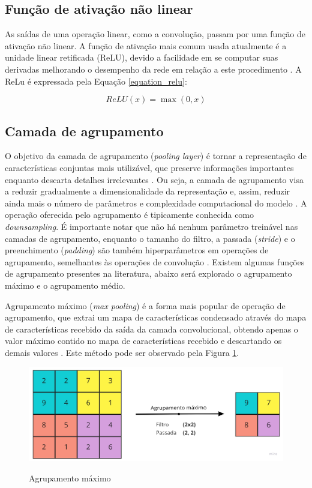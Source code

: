 \documentclass[
	12pt,				%
	oneside,			%
	a4paper,			%
	english,			%
	brazil				%
	]{abntex2ppgsi}
\begin{document}
\subsection{Função de ativação não linear}
As saídas de uma operação linear, como a convolução, passam por uma função de ativação não linear. A função de ativação mais comum usada atualmente é a unidade linear retificada (ReLU), devido a facilidade em se computar suas derivadas melhorando o desempenho da rede em relação a este procedimento \cite{albawi2017understanding}. A ReLu é expressada pela Equação \ref{equation_relu}:

\begin{equation}
  ReLU(x)=\max(0, x)
  \label{equation_relu}
\end{equation}

\subsection{Camada de agrupamento}
O objetivo da camada de agrupamento (\textit{pooling layer}) é tornar a representação de características conjuntas mais utilizável, que preserve informações importantes enquanto descarta detalhes irrelevantes \cite{yu2014mixed}. Ou seja, a camada de agrupamento visa a reduzir gradualmente a dimensionalidade da representação e, assim, reduzir ainda mais o número de parâmetros e complexidade computacional do modelo \cite{o2015introduction}. A operação oferecida pelo agrupamento é tipicamente conhecida como \textit{downsampling}. É importante notar que não há nenhum parâmetro treinável nas camadas de agrupamento, enquanto o tamanho do filtro, a passada (\textit{stride}) e o preenchimento (\textit{padding}) são também hiperparâmetros em operações de agrupamento, semelhantes às operações de convolução \cite{yamashita2018convolutional}. Existem algumas funções de agrupamento presentes na literatura, abaixo será explorado o agrupamento máximo e o agrupamento médio.

Agrupamento máximo (\textit{max pooling}) é a forma mais popular de operação de agrupamento, que extrai um mapa de características condensado através do mapa de características recebido da saída da camada convolucional, obtendo apenas o valor máximo contido no mapa de características recebido e descartando os demais valores \cite{yamashita2018convolutional}. Este método pode ser observado pela Figura \ref{fig:max_pooling}.

\begin{figure}[H]
    \centering
    \caption{Agrupamento máximo}
    \includegraphics[width=1.0\textwidth]{imagens/conceitos_basicos/agrupamento_maximo.jpg}
    \label{fig:max_pooling}
\end{figure}
\end{document}
